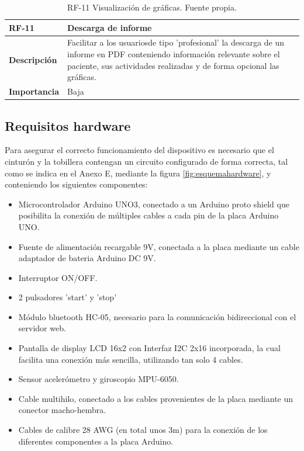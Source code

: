 \begin{table}[p]
    \centering
    \begin{tabularx}{\linewidth}{ p{} p{} }
        \toprule
        \textbf{RF-11}    & \textbf{Descarga de informe}\\
        \toprule
        \textbf{Descripción}              & Facilitar a los usuariosde tipo 'profesional' la descarga de un informe en PDF conteniendo información relevante sobre el paciente, sus actividades realizadas y de forma opcional las gráficas.  \\
        \textbf{Importancia}                & Baja \\
        \bottomrule
    \end{tabularx}
    \caption{RF-11 Visualización de gráficas. Fuente propia.}
    \label{RF-11}
\end{table}
\subsection{Requisitos hardware}
Para asegurar el correcto funcionamiento del dispositivo es necesario que el cinturón y la tobillera contengan un circuito configurado de forma correcta, tal como se indica en el Anexo E, mediante la figura \ref{fig:esquemahardware}, y conteniendo los siguientes componentes:
\begin{itemize}
    \item Microcontrolador Arduino UNO3, conectado a un Arduino proto shield que posibilita la conexión de múltiples cables a cada pin de la placa Arduino UNO.
    \item Fuente de alimentación recargable 9V, conectada a la placa mediante un cable adaptador de bateria Arduino DC 9V.
    \item Interruptor ON/OFF.
    \item 2 pulsadores 'start' y 'stop'
    \item Módulo bluetooth HC-05, necesario para la comunicación bidireccional con el servidor web.
    \item Pantalla de display LCD 16x2 con Interfaz I2C 2x16 incorporada, la cual facilita una conexión más sencilla, utilizando tan solo 4 cables.
    \item Sensor acelerómetro y giroscopio MPU-6050.
    \item Cable multihilo, conectado a los cables provenientes de la placa mediante un conector macho-hembra.
    \item Cables de calibre 28 AWG (en total unos 3m) para la conexión de los diferentes componentes a la placa Arduino.
\end{itemize}

